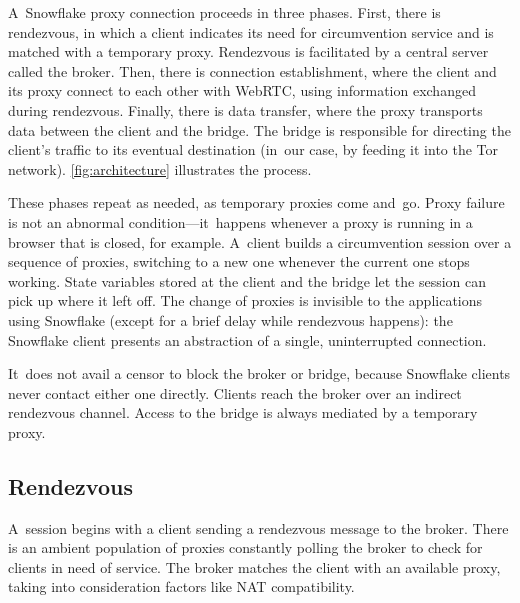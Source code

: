 \documentclass[letterpaper,twocolumn]{article}
\begin{document}
A~Snowflake proxy connection proceeds in three phases.
First, there is rendezvous, in which a client
indicates its need for circumvention service
and is matched with a temporary proxy.
Rendezvous is facilitated by a central server called the broker.
Then, there is connection establishment,
where the client and its proxy connect to each other
with WebRTC, using information exchanged during rendezvous.
Finally, there is data transfer,
where the proxy transports data
between the client and the bridge.
The bridge is responsible for directing the client's traffic
to its eventual destination
(in~our case, by feeding it into the Tor network).
\autoref{fig:architecture} illustrates the process.

These phases repeat as needed, as temporary proxies come and~go.
Proxy failure is not an abnormal condition---it~happens whenever
a proxy is running in a browser that is closed, for example.
A~client builds a circumvention session over
a sequence of proxies, switching to a new one
whenever the current one stops working.
State variables stored at the client and the bridge
let the session can pick up where it left off.
The change of proxies is invisible to the applications using Snowflake
(except for a brief delay while rendezvous happens):
the Snowflake client presents an abstraction of a single, uninterrupted connection.

It~does not avail a censor to block the broker or bridge,
because Snowflake clients never contact either one directly.
Clients reach the broker over an indirect rendezvous channel.
Access to the bridge is always mediated by a temporary proxy.

\subsection{Rendezvous}
\label{sec:rendezvous}

A~session begins with a client sending a rendezvous message to the broker.
There is an ambient population of proxies
constantly polling the broker to check for clients in need of service.
The broker matches the client with an available proxy,
taking into consideration factors like NAT compatibility.
\end{document}
